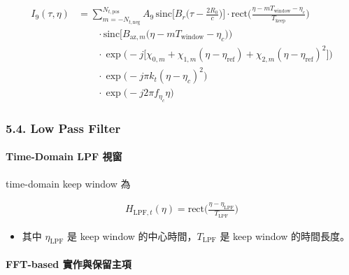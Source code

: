 \documentclass[10pt]{article}
\providecommand{\tightlist}{%
  \setlength{\itemsep}{0pt}\setlength{\parskip}{0pt}}
\begin{document}
\begin{equation}
\begin{aligned}
I_9(\tau,\eta)
&=
\sum_{m=-N_{t,\mathrm{neg}}}^{N_{t,\mathrm{pos}}} A_9\,
\mathrm{sinc}\biggl[ B_r\biggl( \tau-\frac{2R_0}{c} \biggr) \biggr]
\cdot \mathrm{rect}\biggl( \frac{\eta-mT_{\mathrm{window}}-\eta_c}{T_{\mathrm{keep}}} \biggr)\\
&\qquad \cdot \mathrm{sinc}\biggl[ B_{\mathrm{az},m}\biggl( \eta-mT_{\mathrm{window}}-\eta_c \biggr) \biggr)\\
&\qquad \cdot \exp\biggl( -j\biggl[ \chi_{0,m}+\chi_{1,m}(\eta-\eta_{\mathrm{ref}})
+\chi_{2,m}(\eta-\eta_{\mathrm{ref}})^2 \biggr] \biggr)\\
&\qquad \cdot \exp\biggl( -j\pi k_t(\eta-\eta_c)^2 \biggr)\\
&\qquad \cdot \exp\biggl( -j2\pi f_{\eta_c}\eta \biggr)
\end{aligned}
\end{equation}

\hypertarget{low-pass-filter-1}{%
\subsubsection{5.4. Low Pass Filter}\label{low-pass-filter-1}}

\hypertarget{time-domain-lpf-ux8996ux7a97}{%
\paragraph{Time-Domain LPF 視窗}\label{time-domain-lpf-ux8996ux7a97}}

time-domain keep window 為

\begin{equation}
\begin{aligned}
H_{\mathrm{LPF},t}(\eta) = \mathrm{rect}\biggl( \frac{\eta-\eta_{\mathrm{LPF}}}{T_{\mathrm{LPF}}} \biggr)
\end{aligned}
\end{equation}

\begin{itemize}
\tightlist
\item
  其中 \(\eta_{\mathrm{LPF}}\) 是 keep window
  的中心時間，\(T_{\mathrm{LPF}}\) 是 keep window 的時間長度。
\end{itemize}

\hypertarget{fft-based-ux5be6ux4f5cux8207ux4fddux7559ux4e3bux9805}{%
\paragraph{FFT-based
實作與保留主項}\label{fft-based-ux5be6ux4f5cux8207ux4fddux7559ux4e3bux9805}}
\end{document}
